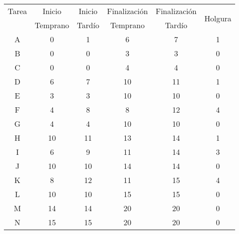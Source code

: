 \begin{tabular}{cccccc}
Tarea  & Inicio & Inicio & Finalización & Finalización & \multirow{2}[1]{*}{Holgura} \\
       & Temprano & Tardío & Temprano & Tardío &  \bigstrut[b]\\
\hline
\hline
A      & 0      & 1      & 6      & 7      & 1 \bigstrut[t]\\
B      & 0      & 0      & 3      & 3      & 0 \\
C      & 0      & 0      & 4      & 4      & 0 \\
D      & 6      & 7      & 10     & 11     & 1 \\
E      & 3      & 3      & 10     & 10     & 0 \\
F      & 4      & 8      & 8      & 12     & 4 \\
G      & 4      & 4      & 10     & 10     & 0 \\
H      & 10     & 11     & 13     & 14     & 1 \\
I      & 6      & 9      & 11     & 14     & 3 \\
J      & 10     & 10     & 14     & 14     & 0 \\
K      & 8      & 12     & 11     & 15     & 4 \\
L      & 10     & 10     & 15     & 15     & 0 \\
M      & 14     & 14     & 20     & 20     & 0 \\
N      & 15     & 15     & 20     & 20     & 0 \bigstrut[b]\\
\hline
\hline
\end{tabular}%
